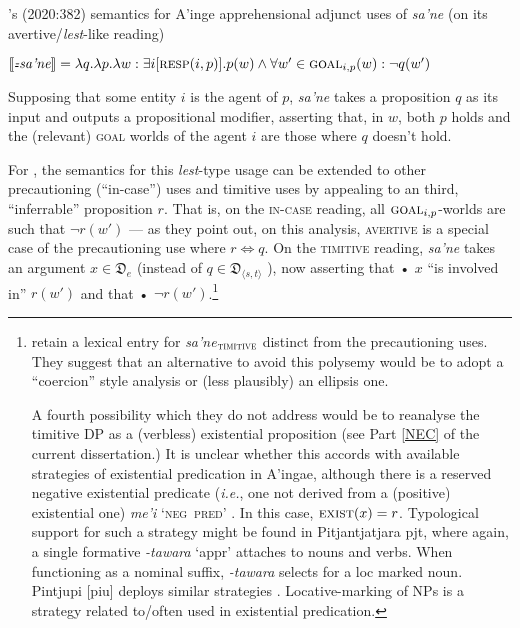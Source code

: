\pex \citeauthor{AnderBois2020}'s (2020:382) semantics for A'inge apprehensional adjunct uses of \textit{\textdblhyphen sa'ne} (on its avertive/\textit{lest}-like reading)


$ \llbracket \textit{\textdblhyphen sa'ne}\rrbracket=\lambda q.\lambda p.\lambda w:\exists i[\textsc{resp}(i,p)]	.p(w)\wedge \forall w'\in\textsc{goal}_{i,p}(w):\neg q(w')  $


Supposing that some entity $ i $ is the agent of $ p $, \textit{\textdblhyphen sa'ne} takes a proposition $ q $ as its input and outputs a propositional modifier, asserting that, in $ w $, both $ p $ holds and the (relevant) \textsc{goal} worlds of the agent $ i $ are those where $ q $ doesn't hold. 
\xe

\noindent For \citeauthor{AnderBois2020}, the semantics for this \textit{lest}-type usage can be extended to other precautioning (``in-case'') uses and timitive uses by appealing to an third, ``inferrable'' proposition $ r $. That is, on the \textsc{in-case} reading, all $ \textsc{goal}_{i,p}$-worlds are such that $\neg r(w') $ --- as they point out, on this analysis, \textsc{avertive} is a special case of the precautioning use where $ r\Leftrightarrow q $. On the \textsc{timitive} reading, \textit{\textdblhyphen sa'ne} takes an argument $ x\in\mathfrak D_e $ (instead of $ q\in \mathfrak D_{\langle s,t\rangle}$
), now asserting that • $ x $ ``is involved in'' $ r(w') $ and that • $ \neg r(w') $.\footnote{\citet[15]{AnderBois2020} retain a lexical entry for \textit{\textdblhyphen sa'ne}$ _{\textsc{timitive}} $ distinct from the precautioning uses. They suggest that an alternative to avoid this polysemy would be to adopt a ``coercion'' style analysis or (less plausibly) an ellipsis one.
		
	A fourth possibility which they do not address would be to reanalyse the timitive DP as a (verbless) existential proposition (see Part \ref{NEC} of the current dissertation.) It is unclear whether this accords with available strategies of existential predication in A'ingae, although there is a reserved negative existential predicate (\textit{i.e.}, one not derived from a (positive) existential one) \textit{me'i} `\textsc{neg~pred}' \citep[according to][]{Hengeveld2018}. In this case, $ \textsc{exist}(x) = r$. Typological support for such a strategy might be found in Pitjantjatjara \gls{pjt}, where again, a single formative \textit{-tawara} `\gls{appr}' attaches to nouns and verbs. When functioning as a nominal suffix, \textit{-tawara} selects for a \gls{loc} marked noun. Pintjupi [\gls{piu}] deploys similar strategies \citep[16-9]{Zester2010}. Locative-marking of NPs is a strategy related to/often used in existential predication.
	}


